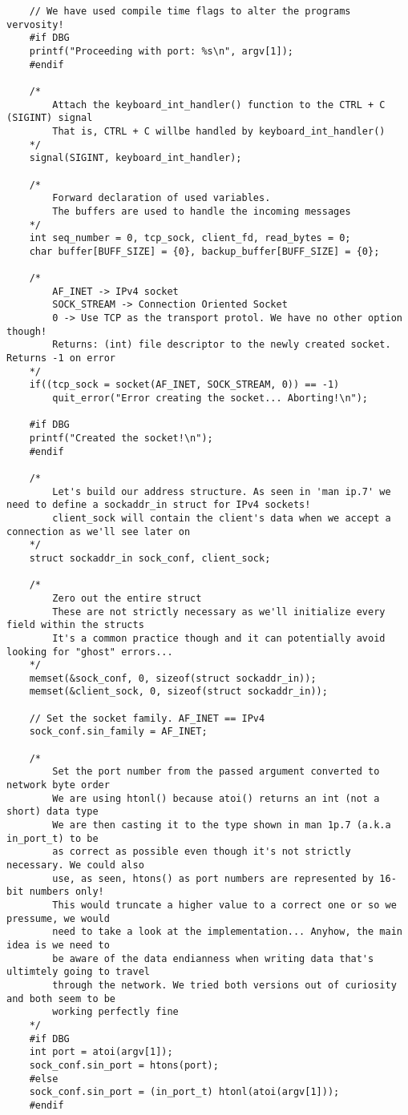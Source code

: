 \documentclass[landscape]{article}
\begin{document}
\begin{verbatim}
    // We have used compile time flags to alter the programs vervosity!
    #if DBG
    printf("Proceeding with port: %s\n", argv[1]);
    #endif

    /*
        Attach the keyboard_int_handler() function to the CTRL + C (SIGINT) signal
        That is, CTRL + C willbe handled by keyboard_int_handler()
    */
    signal(SIGINT, keyboard_int_handler);

    /*
        Forward declaration of used variables.
        The buffers are used to handle the incoming messages
    */
    int seq_number = 0, tcp_sock, client_fd, read_bytes = 0;
    char buffer[BUFF_SIZE] = {0}, backup_buffer[BUFF_SIZE] = {0};

    /*
        AF_INET -> IPv4 socket
        SOCK_STREAM -> Connection Oriented Socket
        0 -> Use TCP as the transport protol. We have no other option though!
        Returns: (int) file descriptor to the newly created socket. Returns -1 on error
    */
    if((tcp_sock = socket(AF_INET, SOCK_STREAM, 0)) == -1)
        quit_error("Error creating the socket... Aborting!\n");

    #if DBG
    printf("Created the socket!\n");
    #endif

    /*
        Let's build our address structure. As seen in 'man ip.7' we need to define a sockaddr_in struct for IPv4 sockets!
        client_sock will contain the client's data when we accept a connection as we'll see later on
    */
    struct sockaddr_in sock_conf, client_sock;

    /*
        Zero out the entire struct
        These are not strictly necessary as we'll initialize every field within the structs
        It's a common practice though and it can potentially avoid looking for "ghost" errors...
    */
    memset(&sock_conf, 0, sizeof(struct sockaddr_in));
    memset(&client_sock, 0, sizeof(struct sockaddr_in));

    // Set the socket family. AF_INET == IPv4
    sock_conf.sin_family = AF_INET;

    /*
        Set the port number from the passed argument converted to network byte order
        We are using htonl() because atoi() returns an int (not a short) data type
        We are then casting it to the type shown in man 1p.7 (a.k.a in_port_t) to be
        as correct as possible even though it's not strictly necessary. We could also
        use, as seen, htons() as port numbers are represented by 16-bit numbers only!
        This would truncate a higher value to a correct one or so we pressume, we would
        need to take a look at the implementation... Anyhow, the main idea is we need to
        be aware of the data endianness when writing data that's ultimtely going to travel
        through the network. We tried both versions out of curiosity and both seem to be
        working perfectly fine
    */
    #if DBG
    int port = atoi(argv[1]);
    sock_conf.sin_port = htons(port);
    #else
    sock_conf.sin_port = (in_port_t) htonl(atoi(argv[1]));
    #endif


\end{verbatim}
\end{document}
